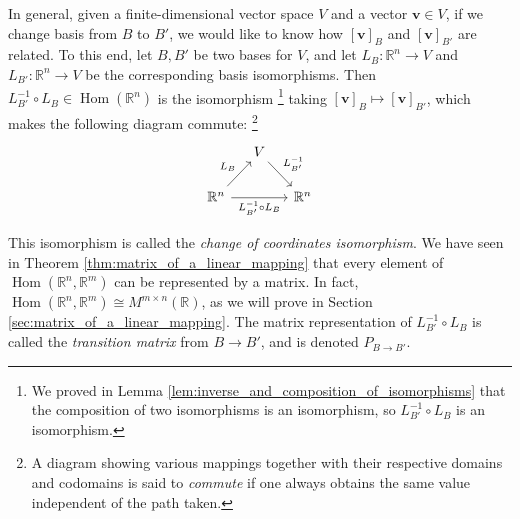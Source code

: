 \documentclass[12pt,letterpaper,reqno]{article}
\numberwithin{equation}{section}
\newcommand{\R}{\ensuremath{\mathbb R}}
\DeclareMathOperator{\Hom}{Hom}
\begin{document}
In general, given a finite-dimensional vector space $V$ and a vector $\mathbf{v} \in V$, if we change basis from $B$ to $B'$, we would like to know how $[\mathbf{v}]_B$ and $[\mathbf{v}]_{B'}$ are related. To this end, let $B,B'$ be two bases for $V$, and let $L_B:\R^n \to V$ and $L_{B'}:\R^n \to V$  be the corresponding basis isomorphisms. Then $L_{B'}^{-1}\circ L_B \in \Hom(\R^n)$ is the isomorphism \footnote{We proved in Lemma \ref{lem:inverse_and_composition_of_isomorphisms} that the composition of two isomorphisms is an isomorphism, so $L_{B'}^{-1} \circ L_B$ is an isomorphism.} taking $[\mathbf{v}]_B \mapsto [\mathbf{v}]_{B'}$, which makes the following diagram commute: \footnote{A diagram showing various mappings together with their respective domains and codomains is said to \emph{commute} if one always obtains the same value independent of the path taken.} 
\begin{equation*}
	\begin{tikzcd}[column sep=small]
& V \arrow[dl, leftarrow, swap,"L_B"] \arrow[dr, "L_{B'}^{-1}"] & \\
\R^n \arrow{rr}[swap]{L_{B'}^{-1} \circ L_B} & & \R^n
\end{tikzcd}	
\end{equation*}
\begin{defn}
This isomorphism is called the \emph{change of coordinates isomorphism}. We have seen in Theorem \ref{thm:matrix_of_a_linear_mapping} that every element of $\Hom(\R^n,\R^m)$ can be represented by a matrix. In fact, $\Hom(\R^n,\R^m)\cong M^{m \times n}(\R)$, as we will prove in Section \ref{sec:matrix_of_a_linear_mapping}. The matrix representation of $L_{B'}^{-1}\circ L_B$ is called the \emph{transition matrix} from $B \to B'$, and is denoted $P_{B \to B'}$.	
\end{defn}
\end{document}
